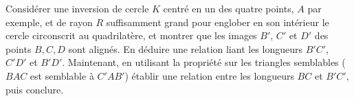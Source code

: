 \begin{exer}
Considérer une inversion de cercle $K$ centré en un des quatre points, $A$ par exemple, et de rayon $R$ suffisamment grand pour englober en son intérieur le cercle circonscrit au quadrilatère, et montrer que les images $B'$, $C'$ et $D'$ des points $B,C,D$ sont alignés. En déduire une relation liant les longueurs $B'C'$, $C'D'$ et $B'D'$. Maintenant, en utilisant la propriété sur les triangles semblables ($BAC$ est semblable à $C'AB'$) établir une relation entre les longueurs $BC$ et $B'C'$, puis conclure.
\end{exer}


